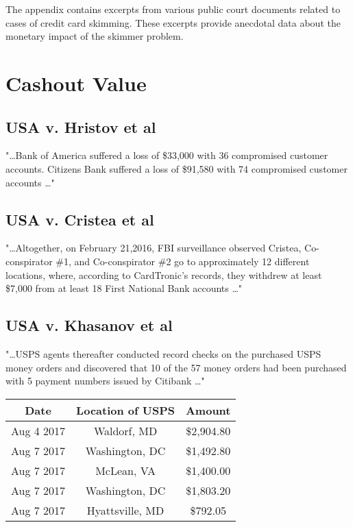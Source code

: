 \label{sec:appendix}
The appendix contains excerpts from various public court documents related to cases of credit card skimming. These excerpts provide anecdotal data about the monetary impact of the skimmer 
problem.

\section{Cashout Value}
\label{sec:appendix:cashout}

\subsection*{USA v. Hristov et al \cite{hristov}}
"\dots Bank of America suffered a loss of \$33,000 with 36
compromised customer accounts.  Citizens Bank suffered a loss of
\$91,580 with 74 compromised customer accounts \dots" 

\subsection*{USA v. Cristea et al \cite{cristea}}
"\dots Altogether, on February 21,2016, FBI surveillance observed Cristea, 
Co-conspirator \#1, and Co-conspirator \#2 go to approximately 12 
different locations, where, according to CardTronic's records, they
withdrew at least \$7,000 from at least 18 First National Bank accounts \dots" 

\subsection*{USA v. Khasanov et al \cite{mekhakian}}
"\dots USPS agents thereafter conducted record checks on the purchased USPS money orders
and discovered that 10 of the 57 money orders had been purchased with 5 payment numbers
issued by Citibank \dots"

\begin{center}
    \begin{tabular}{|c|c|c|}
    	\hline
        \textbf{Date} & \textbf{Location of USPS} & \textbf{Amount} \\ 
        \hline 
        Aug 4 2017 & Waldorf, MD & \$2,904.80 \\
        \hline
        Aug 7 2017 & Washington, DC & \$1,492.80 \\
        \hline
        Aug 7 2017 & McLean, VA & \$1,400.00 \\
        \hline
        Aug 7 2017 & Washington, DC & \$1,803.20 \\
        \hline
        Aug 7 2017 & Hyattsville, MD & \$792.05 \\
    	\hline
    \end{tabular}
\end{center}
 

